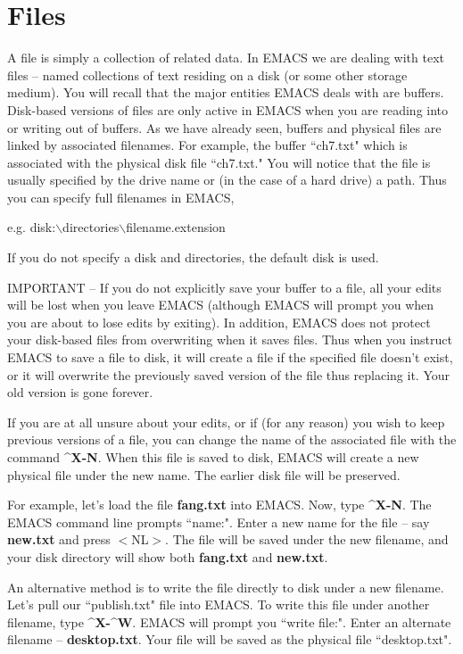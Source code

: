 \chapter{Files}

A file is simply a collection of related data.  In EMACS we are dealing
with text files -- named collections of text residing on a disk (or some
other storage medium).  You will recall that the major entities EMACS
deals with are buffers.  Disk-based versions of files are only active in
EMACS when you are reading into or writing out of buffers.  As we have
already seen, buffers and physical files are linked by associated
filenames.  For example, the buffer ``ch7.txt" which is associated with
the physical disk file ``ch7.txt." You will notice that the file is
usually specified by the drive name or (in the case of a hard drive) a
path.  Thus you can specify full filenames in EMACS,

e.g. disk:$\backslash${}directories$\backslash${}filename.extension

If you do not specify a disk and directories, the default disk is used.

IMPORTANT -- If you do not explicitly save your buffer to a file, all your
edits will be lost when you leave EMACS (although EMACS will prompt you
when you are about to lose edits by exiting).  In addition, EMACS does
not protect your disk-based files from overwriting when it saves files.
Thus when you instruct EMACS to save a file to disk, it will create a
file if the specified file doesn't exist, or it will overwrite the
previously saved version of the file thus replacing it.  Your old
version is gone forever.

If you are at all unsure about your edits, or if (for any reason) you
wish to keep previous versions of a file, you can change the name of the
associated file with the command {\bf{}\^{}X-N}.  When this file is saved
to disk, EMACS will create a new physical file under the new name.  The
earlier disk file will be preserved.

For example, let's load the file {\bf{}fang.txt} into EMACS.  Now, type
{\bf{}\^{}X-N}.  The EMACS command line prompts ``name:".  Enter a new name
for the file -- say {\bf{}new.txt} and press $<${}NL$>${}.  The file will be
saved under the new filename, and your disk directory will show both
{\bf{}fang.txt} and {\bf{}new.txt}.

An alternative method is to write the file directly to disk under a new
filename.  Let's pull our ``publish.txt" file into EMACS.  To write this
file under another filename, type {\bf{}\^{}X-\^{}W}.  EMACS will prompt
you ``write file:".  Enter an alternate filename -- {\bf{}desktop.txt}.
Your file will be saved as the physical file ``desktop.txt".

